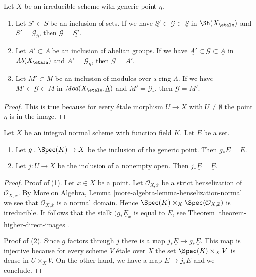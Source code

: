 \begin{lemma}
\label{lemma-irreducible-subsheaf-constant-zero}
Let $X$ be an irreducible scheme with generic point $\eta$.
\begin{enumerate}
\item Let $S' \subset S$ be an inclusion of sets. If we have
$\underline{S'} \subset \mathcal{G} \subset \underline{S}$
in $\Sh(X_\etale)$ and $S' = \mathcal{G}_{\overline{\eta}}$, then
$\mathcal{G} = \underline{S'}$.
\item Let $A' \subset A$ be an inclusion of abelian groups. If we have
$\underline{A'} \subset \mathcal{G} \subset \underline{A}$
in $\textit{Ab}(X_\etale)$ and $A' = \mathcal{G}_{\overline{\eta}}$, then
$\mathcal{G} = \underline{A'}$.
\item Let $M' \subset M$ be an inclusion of modules over a ring $\Lambda$.
If we have $\underline{M'} \subset \mathcal{G} \subset \underline{M}$
in $\textit{Mod}(X_\etale, \underline{\Lambda})$
and $M' = \mathcal{G}_{\overline{\eta}}$, then
$\mathcal{G} = \underline{M'}$.
\end{enumerate}
\end{lemma}

\begin{proof}
This is true because for every \'etale morphism $U \to X$
with $U \not = \emptyset$ the point $\eta$ is in the image.
\end{proof}

\begin{lemma}
\label{lemma-push-constant-sheaf-from-open}
Let $X$ be an integral normal scheme with function field $K$.
Let $E$ be a set.
\begin{enumerate}
\item Let $g : \Spec(K) \to X$ be the inclusion of the generic point.
Then $g_*\underline{E} = \underline{E}$.
\item Let $j : U \to X$ be the inclusion of a nonempty open. Then
$j_*\underline{E} = \underline{E}$.
\end{enumerate}
\end{lemma}

\begin{proof}
Proof of (1). Let $x \in X$ be a point. Let $\mathcal{O}_{X, \overline{x}}$
be a strict henselization of $\mathcal{O}_{X, x}$. 
By More on Algebra, Lemma \ref{more-algebra-lemma-henselization-normal}
we see that $\mathcal{O}_{X, \overline{x}}$ is a normal domain.
Hence $\Spec(K) \times_X \Spec(\mathcal{O}_{X, \overline{x}})$
is irreducible. It follows that
the stalk $(g_*\underline{E}_{\underline{x}}$ is equal to $E$,
see Theorem \ref{theorem-higher-direct-images}.

\medskip\noindent
Proof of (2). Since $g$ factors through $j$ there is a map
$j_*\underline{E} \to g_*\underline{E}$. This map is injective because
for every scheme $V$ \'etale over $X$ the set $\Spec(K) \times_X V$
is dense in $U \times_X V$. On the other hand, we have a map
$\underline{E} \to j_*\underline{E}$ and we conclude.
\end{proof}






